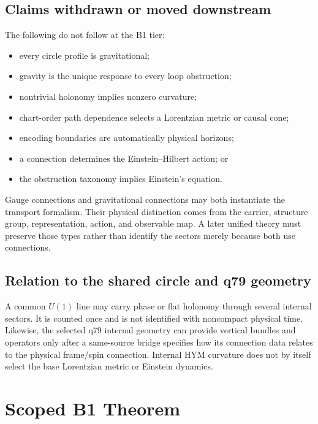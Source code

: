 \documentclass[11pt]{article}
\begin{document}
\subsection{Claims withdrawn or moved downstream}

The following do not follow at the B1 tier:
\begin{itemize}
\item every circle profile is gravitational;
\item gravity is the unique response to every loop obstruction;
\item nontrivial holonomy implies nonzero curvature;
\item chart-order path dependence selects a Lorentzian metric or causal cone;
\item encoding boundaries are automatically physical horizons;
\item a connection determines the Einstein--Hilbert action; or
\item the obstruction taxonomy implies Einstein's equation.
\end{itemize}

Gauge connections and gravitational connections may both instantiate the
transport formalism.  Their physical distinction comes from the carrier,
structure group, representation, action, and observable map.  A later unified
theory must preserve those types rather than identify the sectors merely
because both use connections.

\subsection{Relation to the shared circle and q79 geometry}

A common $U(1)$ line may carry phase or flat holonomy through several internal
sectors.  It is counted once and is not identified with noncompact physical
time.  Likewise, the selected q79 internal geometry can provide vertical
bundles and operators only after a same-source bridge specifies how its
connection data relates to the physical frame/spin connection.  Internal HYM
curvature does not by itself select the base Lorentzian metric or Einstein
dynamics.

\section{Scoped B1 Theorem}
\end{document}
